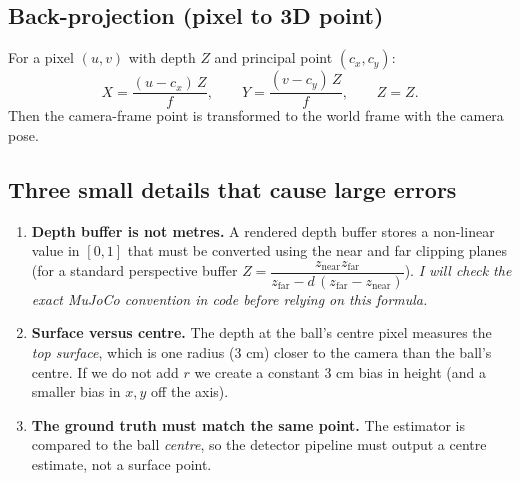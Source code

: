 \documentclass[11pt,a4paper]{article}
\begin{document}
\subsection{Back-projection (pixel to 3D point)}
For a pixel $(u,v)$ with depth $Z$ and principal point $(c_x,c_y)$:
\[
X=\frac{(u-c_x)\,Z}{f},\qquad Y=\frac{(v-c_y)\,Z}{f},\qquad Z=Z .
\]
Then the camera-frame point is transformed to the world frame with the camera pose.

\subsection{Three small details that cause large errors}
\begin{enumerate}
\item \textbf{Depth buffer is not metres.} A rendered depth buffer stores a non-linear value in
$[0,1]$ that must be converted using the near and far clipping planes
(for a standard perspective buffer $Z=\dfrac{z_{\mathrm{near}}z_{\mathrm{far}}}
{z_{\mathrm{far}}-d\,(z_{\mathrm{far}}-z_{\mathrm{near}})}$). \emph{I will check the exact MuJoCo
convention in code before relying on this formula.}
\item \textbf{Surface versus centre.} The depth at the ball's centre pixel measures the
\emph{top surface}, which is one radius ($3$ cm) closer to the camera than the ball's centre. If we
do not add $r$ we create a constant $3$ cm bias in height (and a smaller bias in $x,y$ off the axis).
\item \textbf{The ground truth must match the same point.} The estimator is compared to the ball
\emph{centre}, so the detector pipeline must output a centre estimate, not a surface point.
\end{enumerate}
\end{document}
